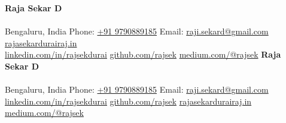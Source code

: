 \newcommand{\MobileContact}{Phone: \href{tel:+919790889185}{+91 9790889185}}
\begin{center}
\ifonepage
  {\LARGE\bfseries Raja Sekar D}\\[1pt]
  {\bfseries\RoleHeadline}\\[2pt]
  Bengaluru, India {\textbar} \MobileContact {\textbar} Email: \href{mailto:raji.sekard@gmail.com}{raji.sekard@gmail.com} {\textbar} \href{https://rajasekardurairaj.in}{rajasekardurairaj.in}\\[1pt]
  \href{https://linkedin.com/in/rajsekdurai}{linkedin.com/in/rajsekdurai} {\textbar} \href{https://github.com/rajsek}{github.com/rajsek} {\textbar} \href{https://medium.com/@rajsek}{medium.com/@rajsek}
\else
  {\LARGE\bfseries Raja Sekar D}\\[3pt]
  {\bfseries\RoleHeadline}\\[3pt]
  Bengaluru, India \hspace{4pt}{\textbar}\hspace{4pt} \MobileContact \hspace{4pt}{\textbar}\hspace{4pt} Email: \href{mailto:raji.sekard@gmail.com}{raji.sekard@gmail.com}\\[2pt]
  \href{https://linkedin.com/in/rajsekdurai}{linkedin.com/in/rajsekdurai} \hspace{4pt}{\textbar}\hspace{4pt}
  \href{https://github.com/rajsek}{github.com/rajsek} \hspace{4pt}{\textbar}\hspace{4pt}
  \href{https://rajasekardurairaj.in}{rajasekardurairaj.in} \hspace{4pt}{\textbar}\hspace{4pt}
  \href{https://medium.com/@rajsek}{medium.com/@rajsek}
\fi
\end{center}
